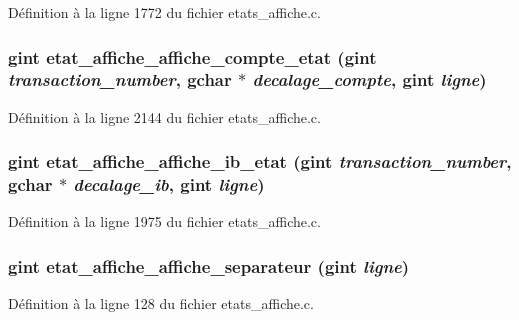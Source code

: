 Définition à la ligne 1772 du fichier etats\_\-affiche.c.

\subsubsection[{etat\_\-affiche\_\-affiche\_\-compte\_\-etat}]{\setlength{\rightskip}{0pt plus 5cm}gint etat\_\-affiche\_\-affiche\_\-compte\_\-etat (gint {\em transaction\_\-number}, \/  gchar $\ast$ {\em decalage\_\-compte}, \/  gint {\em ligne})}\label{etats__affiche_8h_af8b7ccec4ce47a0fc4f85b185900a665}


Définition à la ligne 2144 du fichier etats\_\-affiche.c.

\subsubsection[{etat\_\-affiche\_\-affiche\_\-ib\_\-etat}]{\setlength{\rightskip}{0pt plus 5cm}gint etat\_\-affiche\_\-affiche\_\-ib\_\-etat (gint {\em transaction\_\-number}, \/  gchar $\ast$ {\em decalage\_\-ib}, \/  gint {\em ligne})}\label{etats__affiche_8h_a644cc87f913a5116fdf64d41f52b366a}


Définition à la ligne 1975 du fichier etats\_\-affiche.c.

\subsubsection[{etat\_\-affiche\_\-affiche\_\-separateur}]{\setlength{\rightskip}{0pt plus 5cm}gint etat\_\-affiche\_\-affiche\_\-separateur (gint {\em ligne})}\label{etats__affiche_8h_a482bd2d47cd0b5df46e0198231f5660c}


Définition à la ligne 128 du fichier etats\_\-affiche.c.

